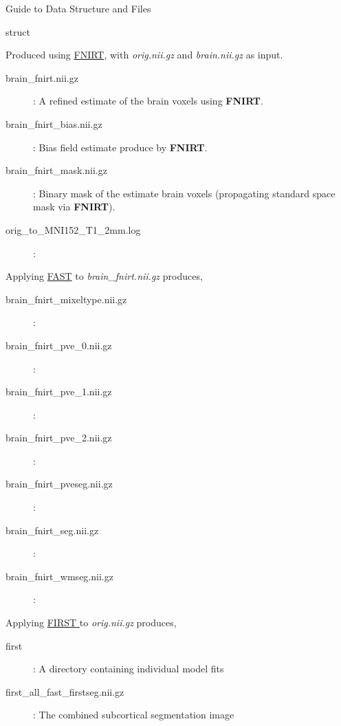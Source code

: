 \documentclass[]{report}
\begin{document}
\begin{chapter}{Guide to Data Structure and Files}
\begin{section}{struct}
\begin{description}
	Produced using  \href{http://fsl.fmrib.ox.ac.uk/fsl/fslwiki/FNIRT}{\color{blue} FNIRT}, with {\it orig.nii.gz} and {\it brain.nii.gz} as input.
	\begin{description}
		\item[brain\_fnirt.nii.gz] : A refined estimate of the brain voxels using {\bf FNIRT}.
		\item[brain\_fnirt\_bias.nii.gz] : Bias field estimate produce by  {\bf FNIRT}.
		\item[brain\_fnirt\_mask.nii.gz] : Binary mask of the estimate brain voxels (propagating standard space mask via {\bf FNIRT}).
		\item[orig\_to\_MNI152\_T1\_2mm.log] :
	\end{description}

	Applying  \href{http://fsl.fmrib.ox.ac.uk/fsl/fslwiki/FAST}{\color{blue} FAST} to  {\it brain\_fnirt.nii.gz} produces, 
	\begin{description}
		\item[brain\_fnirt\_mixeltype.nii.gz] :
		\item[brain\_fnirt\_pve\_0.nii.gz] :
		\item[brain\_fnirt\_pve\_1.nii.gz] :
		\item[brain\_fnirt\_pve\_2.nii.gz] :
		\item[brain\_fnirt\_pveseg.nii.gz] :
		\item[brain\_fnirt\_seg.nii.gz] :
		\item[brain\_fnirt\_wmseg.nii.gz] :
	\end{description}

	Applying \href{http://fsl.fmrib.ox.ac.uk/fsl/fsl-4.1.9/first/index.html}{\color{blue} FIRST } to  {\it orig.nii.gz} produces, 
	\begin{description}
	\item[first] : A directory containing individual model fits 
	\item[first\_all\_fast\_firstseg.nii.gz] : The combined subcortical segmentation image
		\end{description}
		\end{description}

\end{section}

\end{chapter}
\end{document}
